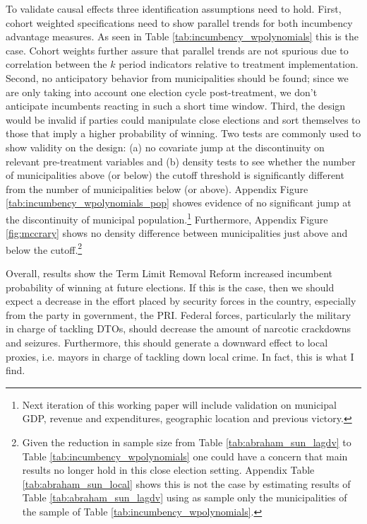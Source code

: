 \documentclass[12pt]{amsart}
\numberwithin{equation}{section}
\theoremstyle{definition}
\theoremstyle{definition}
\theoremstyle{definition}
\begin{document}
To validate causal effects three identification assumptions need to hold. First, cohort weighted specifications need to show parallel trends for both incumbency advantage measures. As seen in Table \ref{tab:incumbency_wpolynomials}  this is the case. Cohort weights further assure that parallel trends are not spurious due to correlation between the $k$ period indicators relative to treatment implementation. Second, no anticipatory behavior from municipalities should be found; since we are only taking into account one election cycle post-treatment, we don't anticipate incumbents reacting in such a short time window. %
Third, the design would be invalid if parties could manipulate close elections and sort themselves to those that imply a higher probability of winning. Two tests are commonly used to show validity on the design: (a) no covariate jump at the discontinuity on relevant pre-treatment variables and (b) density tests to see whether the number of municipalities above (or below) the cutoff threshold is significantly different from the number of municipalities below (or above). Appendix Figure \ref{tab:incumbency_wpolynomials_pop} showes evidence of no significant jump at the discontinuity of municipal population.\footnote{Next iteration of this working paper will include validation on municipal GDP, revenue and expenditures, geographic location and previous victory.} Furthermore, Appendix Figure \ref{fig:mccrary} shows no density difference between municipalities just above and below the cutoff.\footnote{Given the reduction in sample size from Table \ref{tab:abraham_sun_lagdv} to Table \ref{tab:incumbency_wpolynomials} one could have a concern that main results no longer hold in this close election setting. Appendix Table \ref{tab:abraham_sun_local} shows this is not the case by estimating results of Table \ref{tab:abraham_sun_lagdv} using as sample only the municipalities of the sample of Table \ref{tab:incumbency_wpolynomials}.}   

Overall, results show the Term Limit Removal Reform increased incumbent probability of winning at future elections. If this is the case, then we should expect a decrease in the effort placed by security forces in the country, especially from the party in government, the PRI. Federal forces, particularly the military in charge of tackling DTOs, should decrease the amount of narcotic crackdowns and seizures. Furthermore, this should generate a downward effect to local proxies, i.e. mayors in charge of tackling down local crime. In fact, this is what I find. 
\end{document}
